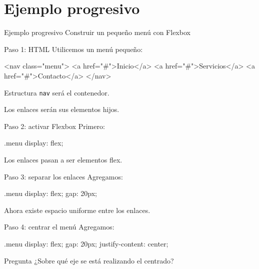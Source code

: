 \documentclass[aspectratio=169,11.5pt]{beamer}
\begin{document}
    \section{Ejemplo progresivo}

    \SectionSlide
    {Ejemplo progresivo}
    {Construir un pequeño menú con Flexbox}

    \begin{frame}[fragile]{Paso 1: HTML}
        Utilicemos un menú pequeño:

        \begin{htmlcodedark}
            <nav class="menu">
            <a href="#">Inicio</a>
            <a href="#">Servicios</a>
            <a href="#">Contacto</a>
            </nav>
        \end{htmlcodedark}

        \begin{block}{Estructura}
            \texttt{nav} será el contenedor.

            Los enlaces serán sus elementos hijos.
        \end{block}
    \end{frame}

    \begin{frame}[fragile]{Paso 2: activar Flexbox}
        Primero:

        \begin{csscodedark}
            .menu {
                display: flex;
            }
        \end{csscodedark}

        Los enlaces pasan a ser
        elementos flex.
    \end{frame}

    \begin{frame}[fragile]{Paso 3: separar los enlaces}
        Agregamos:

        \begin{csscodedark}
            .menu {
                display: flex;
                gap: 20px;
            }
        \end{csscodedark}

        Ahora existe espacio uniforme
        entre los enlaces.
    \end{frame}

    \begin{frame}[fragile]{Paso 4: centrar el menú}
        Agregamos:

        \begin{csscodedark}
            .menu {
                display: flex;
                gap: 20px;
                justify-content: center;
            }
        \end{csscodedark}

        \begin{block}{Pregunta}
            ¿Sobre qué eje se está realizando
            el centrado?
        \end{block}
    \end{frame}
\end{document}
